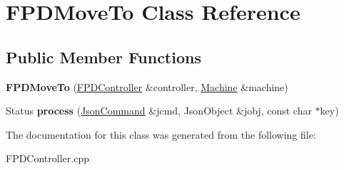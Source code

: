 \hypertarget{class_f_p_d_move_to}{\section{F\+P\+D\+Move\+To Class Reference}
\label{class_f_p_d_move_to}
}
\subsection*{Public Member Functions}
\begin{DoxyCompactItemize}
\item 
\hypertarget{class_f_p_d_move_to_a686b5198381fa8e19e5c9956a6575124}{{\bfseries F\+P\+D\+Move\+To} (\hyperlink{classfirestep_1_1_f_p_d_controller}{F\+P\+D\+Controller} \&controller, \hyperlink{classfirestep_1_1_machine}{Machine} \&machine)}\label{class_f_p_d_move_to_a686b5198381fa8e19e5c9956a6575124}

\item 
\hypertarget{class_f_p_d_move_to_a4b30a96bbd91a4a5315d7bb641b353b5}{Status {\bfseries process} (\hyperlink{classfirestep_1_1_json_command}{Json\+Command} \&jcmd, Json\+Object \&jobj, const char $\ast$key)}\label{class_f_p_d_move_to_a4b30a96bbd91a4a5315d7bb641b353b5}

\end{DoxyCompactItemize}


The documentation for this class was generated from the following file\+:\begin{DoxyCompactItemize}
\item 
F\+P\+D\+Controller.\+cpp\end{DoxyCompactItemize}
